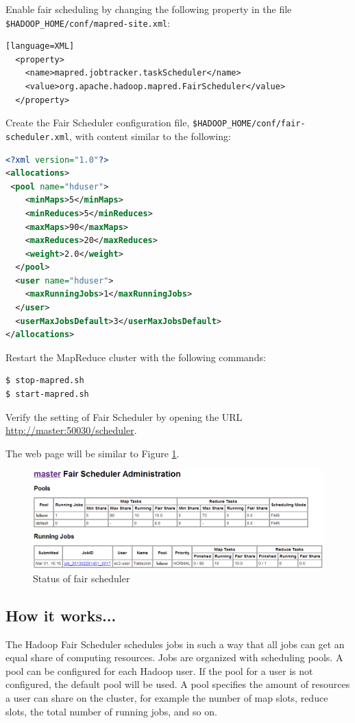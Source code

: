 Enable fair scheduling by changing the following property in the file \verb|$HADOOP_HOME/conf/mapred-site.xml|:
\begin{verbatim}[language=XML]
  <property>
    <name>mapred.jobtracker.taskScheduler</name>
    <value>org.apache.hadoop.mapred.FairScheduler</value>
  </property>
\end{verbatim}

Create the Fair Scheduler configuration file, \verb|$HADOOP_HOME/conf/fair-scheduler.xml|, with content similar to the following: 
\lstset{style=bashstyle}
\begin{lstlisting}[language=XML]
<?xml version="1.0"?> 
<allocations>
 <pool name="hduser">
    <minMaps>5</minMaps>
    <minReduces>5</minReduces>
    <maxMaps>90</maxMaps>
    <maxReduces>20</maxReduces>
    <weight>2.0</weight>
  </pool>
  <user name="hduser">
    <maxRunningJobs>1</maxRunningJobs>
  </user>
  <userMaxJobsDefault>3</userMaxJobsDefault>
</allocations>
\end{lstlisting}

Restart the MapReduce cluster with the following commands:
\lstset{style=bashstyle}
\begin{lstlisting}[language=bash]
$ stop-mapred.sh
$ start-mapred.sh
\end{lstlisting}

Verify the setting of Fair Scheduler by opening the URL \url{http://master:50030/scheduler}.

The web page will be similar to Figure \ref{fig:fairscheduler}.
\begin{figure}[ht]
  \centering
  \includegraphics[width=.90\textwidth]{figs/5163os_04_16.png}
  \caption{Status of fair scheduler}\label{fig:fairscheduler}
\end{figure} 
\subsection*{How it works...}
The Hadoop Fair Scheduler schedules jobs in such a way that all jobs can get an equal share of computing resources. Jobs are organized with scheduling pools. A pool can be configured for each Hadoop user. If the pool for a user is not configured, the default pool will be used. A pool specifies the amount of resources a user can share on the cluster, for example the number of map slots, reduce slots, the total number of running jobs, and so on.

